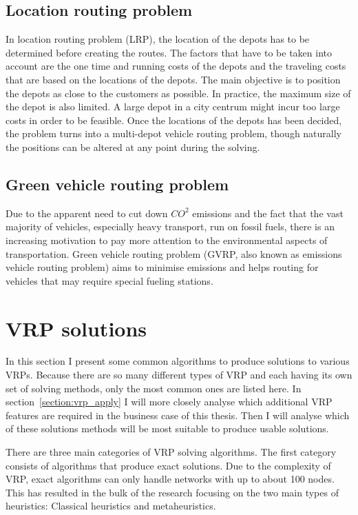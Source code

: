 \subsection{Location routing problem}

In location routing problem (LRP), the location of the depots has to be determined before creating the routes. The factors that have to be taken into account are the one time and running costs of the depots and the traveling costs that are based on the locations of the depots. The main objective is to position the depots as close to the customers as possible. In practice, the maximum size of the depot is also limited. A large depot in a city centrum might incur too large costs in order to be feasible. Once the locations of the depots has been decided, the problem turns into a multi-depot vehicle routing problem, though naturally the positions can be altered at any point during the solving. \cite{tuzun1999two}


\subsection{Green vehicle routing problem}

Due to the apparent need to cut down $CO^2$ emissions and the fact that the vast majority of vehicles, especially heavy transport, run on fossil fuels, there is an increasing motivation to pay more attention to the environmental aspects of transportation. Green vehicle routing problem (GVRP, also known as emissions vehicle routing problem) aims to minimise emissions and helps routing for vehicles that may require special fueling stations. \cite{erdougan2012green}



\section{VRP solutions}

In this section I present some common algorithms to produce solutions to various VRPs. Because there are so many different types of VRP and each having its own set of solving methods, only the most common ones are listed here. In section~\ref{section:vrp_apply} I will more closely analyse which additional VRP features are required in the business case of this thesis. Then I will analyse which of these solutions methods will be most suitable to produce usable solutions.

There are three main categories of VRP solving algorithms. The first category consists of algorithms that produce exact solutions. Due to the complexity of VRP, exact algorithms can only handle networks with up to about 100 nodes. This has resulted in the bulk of the research focusing on the two main types of heuristics: Classical heuristics and metaheuristics. \cite{laporte2007you}  

